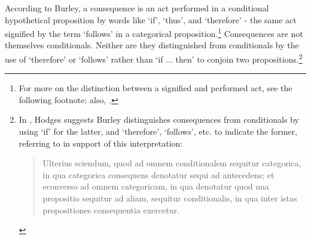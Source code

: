 \documentclass[]{birkjour}
\begin{document}
According to Burley, a consequence is an act performed in a conditional hypothetical proposition by words like `if', `thus', and `therefore' - the same act signified by the term `follows' in a categorical proposition.\footnote{For more on the distinction between a signified and performed act, see the following footnote; also, \autocite{Nuchelmans1988}.} Consequences are not themselves conditionals. Neither are they distinguished from conditionals by the use of `therefore' or `follows' rather than `if ... then' to conjoin two propositions.\footnote{In \autocite{HodgesBurley}, Hodges suggests Burley distinguishes consequences from conditionals by using `if' for the latter, and `therefore', `follows', etc. to indicate the former, referring to \autocite[p. 78.10-14]{BurleyDPAL} in support of this interpretation:
	\begin{quote}
		Ulterius sciendum, quod ad omnem conditionalem sequitur categorica, in qua categorica consequens denotatur sequi ad antecedens; et econverso ad omnem categoricam, in qua denotatur quod una propositio sequitur ad aliam, sequitur conditionalis, in qua inter istas propositiones consequentia exercetur.
	\end{quote}
	
}
\end{document}
